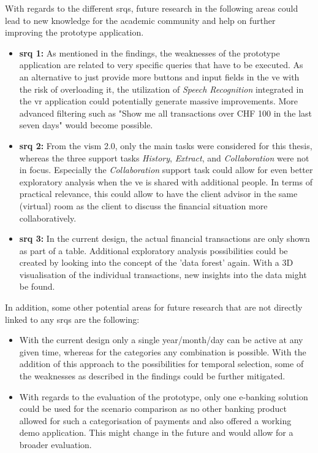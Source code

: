 With regards to the different \glspl{srq}, future research in the following areas could lead to new knowledge for the academic community and help on further improving the prototype application.
\begin{itemize}[]
	\item \textbf{\gls{srq} 1:} As mentioned in the findings, the weaknesses of the prototype application are related to very specific queries that have to be executed. As an alternative to just provide more buttons and input fields in the \gls{ve} with the risk of overloading it, the utilization of \textit{Speech Recognition} integrated in the \gls{vr} application could potentially generate massive improvements. More advanced filtering such as "Show me all transactions over CHF 100 in the last seven days" would become possible.
	
	\item \textbf{\gls{srq} 2:} From the \gls{vism} 2.0, only the main tasks were considered for this thesis, whereas the three support tasks \textit{History}, \textit{Extract}, and \textit{Collaboration} were not in focus. Especially the \textit{Collaboration} support task could allow for even better exploratory analysis when the \gls{ve} is shared with additional people. In terms of practical relevance, this could allow to have the client advisor in the same (virtual) room as the client to discuss the financial situation more collaboratively.
	
	\item \textbf{\gls{srq} 3:} In the current design, the actual financial transactions are only shown as part of a table. Additional exploratory analysis possibilities could be created by looking into the concept of the 'data forest' again. With a 3D visualisation of the individual transactions, new insights into the data might be found.
\end{itemize}
In addition, some other potential areas for future research that are not directly linked to any \glspl{srq} are the following:
\begin{itemize}[]
	\item With the current design only a single year/month/day can be active at any given time, whereas for the categories any combination is possible. With the addition of this approach to the possibilities for temporal selection, some of the weaknesses as described in the findings could be further mitigated.
	
	\item With regards to the evaluation of the prototype, only one e-banking solution could be used for the scenario comparison as no other banking product allowed for such a categorisation of payments and also offered a working demo application. This might change in the future and would allow for a broader evaluation.
\end{itemize}
